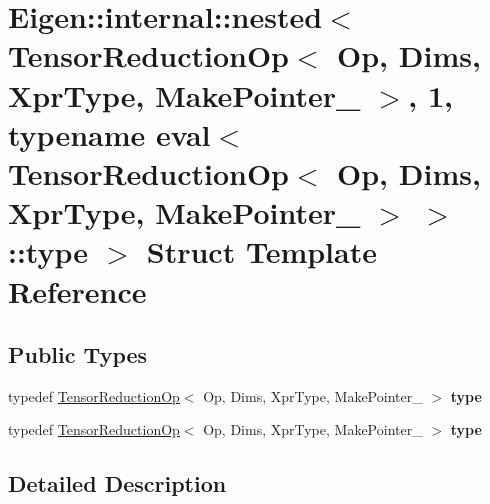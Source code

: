 \hypertarget{struct_eigen_1_1internal_1_1nested_3_01_tensor_reduction_op_3_01_op_00_01_dims_00_01_xpr_type_003b0e9bfd65794f3be6d0916aaf050d6d}{}\section{Eigen\+:\+:internal\+:\+:nested$<$ Tensor\+Reduction\+Op$<$ Op, Dims, Xpr\+Type, Make\+Pointer\+\_\+ $>$, 1, typename eval$<$ Tensor\+Reduction\+Op$<$ Op, Dims, Xpr\+Type, Make\+Pointer\+\_\+ $>$ $>$\+:\+:type $>$ Struct Template Reference}
\label{struct_eigen_1_1internal_1_1nested_3_01_tensor_reduction_op_3_01_op_00_01_dims_00_01_xpr_type_003b0e9bfd65794f3be6d0916aaf050d6d}
\subsection*{Public Types}
\begin{DoxyCompactItemize}
\item 
\mbox{\label{struct_eigen_1_1internal_1_1nested_3_01_tensor_reduction_op_3_01_op_00_01_dims_00_01_xpr_type_003b0e9bfd65794f3be6d0916aaf050d6d_ad7936658e7838927249d3da19c24bdbe}} 
typedef \hyperlink{class_eigen_1_1_tensor_reduction_op}{Tensor\+Reduction\+Op}$<$ Op, Dims, Xpr\+Type, Make\+Pointer\+\_\+ $>$ {\bfseries type}
\item 
\mbox{\label{struct_eigen_1_1internal_1_1nested_3_01_tensor_reduction_op_3_01_op_00_01_dims_00_01_xpr_type_003b0e9bfd65794f3be6d0916aaf050d6d_ad7936658e7838927249d3da19c24bdbe}} 
typedef \hyperlink{class_eigen_1_1_tensor_reduction_op}{Tensor\+Reduction\+Op}$<$ Op, Dims, Xpr\+Type, Make\+Pointer\+\_\+ $>$ {\bfseries type}
\end{DoxyCompactItemize}


\subsection{Detailed Description}
